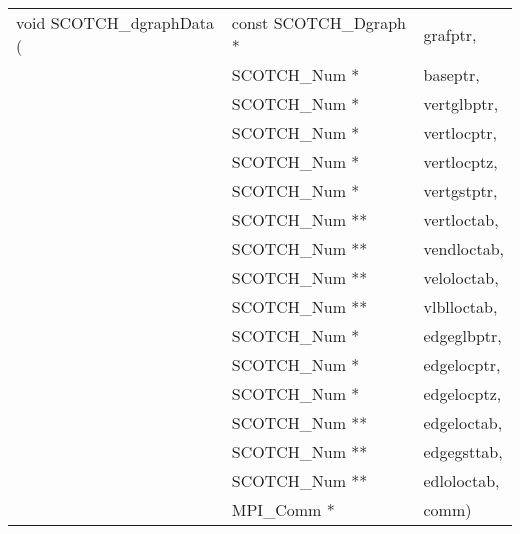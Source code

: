 \begin{itemize}
\progsyn

{\tt\begin{tabular}{l@{}ll}
void SCOTCH\_dgraphData ( & const SCOTCH\_Dgraph * & grafptr,    \\
                          & SCOTCH\_Num *          & baseptr,    \\
                          & SCOTCH\_Num *          & vertglbptr, \\
                          & SCOTCH\_Num *          & vertlocptr, \\
                          & SCOTCH\_Num *          & vertlocptz, \\
                          & SCOTCH\_Num *          & vertgstptr, \\
                          & SCOTCH\_Num **         & vertloctab, \\
                          & SCOTCH\_Num **         & vendloctab, \\
                          & SCOTCH\_Num **         & veloloctab, \\
                          & SCOTCH\_Num **         & vlblloctab, \\
                          & SCOTCH\_Num *          & edgeglbptr, \\
                          & SCOTCH\_Num *          & edgelocptr, \\
                          & SCOTCH\_Num *          & edgelocptz, \\
                          & SCOTCH\_Num **         & edgeloctab, \\
                          & SCOTCH\_Num **         & edgegsttab, \\
                          & SCOTCH\_Num **         & edloloctab, \\
                          & MPI\_Comm *            & comm)
\end{tabular}}


\end{itemize}
